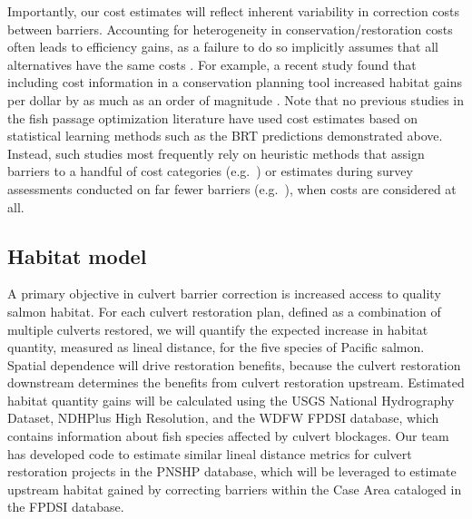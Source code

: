 Importantly, our cost estimates will reflect inherent variability in correction costs between barriers. Accounting for heterogeneity in conservation/restoration costs often leads to efficiency gains, as a failure to do so implicitly assumes that all alternatives have the same costs \citep{babcock_targeting_1997,naidoo_integrating_2006}. For example, a recent study found that including cost information in a conservation planning tool increased habitat gains per dollar by as much as an order of magnitude \citep{field_quantifying_2019}. Note that no previous studies in the fish passage optimization literature have used cost estimates based on statistical learning methods such as the BRT predictions demonstrated above. Instead, such studies most frequently rely on heuristic methods that assign barriers to a handful of cost categories (e.g.\ \cite{hermoso_accessible_2021}) or estimates during survey assessments conducted on far fewer barriers (e.g.\ \citep{ohanley_restoring_2013,king_toolkit_2017}), when costs are considered at all. 

\subsection*{Habitat model}

A primary objective in culvert barrier correction is increased access to quality salmon habitat. For each culvert restoration plan, defined as a combination of multiple culverts restored, we will quantify the expected increase in habitat quantity, measured as lineal distance, for the five species of Pacific salmon. Spatial dependence will drive restoration benefits, because the culvert restoration downstream determines the benefits from culvert restoration upstream. Estimated habitat quantity gains will be calculated using the USGS National Hydrography Dataset, NDHPlus High Resolution, and the WDFW FPDSI database, which contains information about fish species affected by culvert blockages. Our team has developed code to estimate similar lineal distance metrics for culvert restoration projects in the PNSHP database, which will be leveraged to estimate upstream habitat gained by correcting barriers within the Case Area cataloged in the FPDSI database. 


